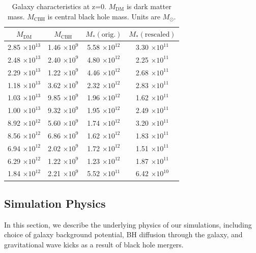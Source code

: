 \documentclass[fleqn,usenatbib,useAMS]{mnras}
\begin{document}
\begin{table}
\begin{center}
\caption{Galaxy characteristics at z=0. $M_\mathrm{DM}$ is dark matter mass.  $M_\mathrm{CBH}$ is central black hole mass.  Units are $M_{\odot}$.}
\begin{tabular} {|c | c | c| c|}
\hline
$M_\mathrm{DM}$ & $M_\mathrm{CBH}$ & $M_{*} \mathrm{(orig.)}$ & $M_{*} \mathrm{(rescaled)}$ \\
\hline
 2.85 $\times 10^{13}$ 	&	 1.46 $\times 10^9$	&	5.58 $\times 10^{12}$ 	&	3.30 $\times 10^{11}$  \\
 2.48 $\times 10^{13}$ 	&	 2.40 $\times 10^9$	&	4.80 $\times 10^{12}$ 	&	2.25 $\times 10^{11}$  \\
 2.29 $\times 10^{13}$ 	&	 1.22 $\times 10^9$	&	4.46 $\times 10^{12}$ 	&	2.68 $\times 10^{11}$  \\
 1.18 $\times 10^{13}$ 	&	 3.62 $\times 10^9$	&	2.32 $\times 10^{12}$ 	&	2.83 $\times 10^{11}$  \\
 1.03 $\times 10^{13}$ 	&	 9.85 $\times 10^9$	&	1.96 $\times 10^{12}$ 	&	1.62 $\times 10^{11}$  \\
 1.00 $\times 10^{13}$ 	&	 9.32 $\times 10^9$	&	1.95 $\times 10^{12}$ 	&	2.49 $\times 10^{11}$  \\
 8.92 $\times 10^{12}$ 	&	 5.60 $\times 10^9$	&	1.74 $\times 10^{12}$ 	&	3.20 $\times 10^{11}$  \\
 8.56 $\times 10^{12}$ 	&	 6.86 $\times 10^9$	&	1.62 $\times 10^{12}$ 	&	1.83 $\times 10^{11}$  \\
 6.94 $\times 10^{12}$ 	&	 2.02 $\times 10^9$	&	1.72 $\times 10^{12}$ 	&	1.51 $\times 10^{11}$  \\
 6.29 $\times 10^{12}$ 	&	 1.22 $\times 10^9$	&	1.23 $\times 10^{12}$ 	&	1.87 $\times 10^{11}$  \\
 1.84 $\times 10^{12}$ 	&	 2.21 $\times 10^9$	&	5.52 $\times 10^{11}$ 	&	6.42 $\times 10^{10}$  \\
\hline
\end{tabular}
\end{center}
\label{table:gal_char}
\end{table}

\subsection{Simulation Physics}
In this section, we describe the underlying physics of our simulations, including choice of galaxy background potential, BH diffusion through the galaxy, and gravitational wave kicks as a result of black hole mergers.
\end{document}
